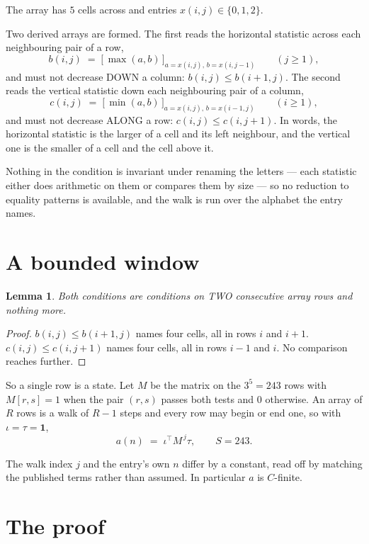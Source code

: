 \documentclass[11pt,a4paper]{article}
\theoremstyle{plain}
\newtheorem{lemma}[theorem]{Lemma}
\theoremstyle{definition}
\begin{document}
The array has $5$ cells across and entries $x(i,j)\in\{0,1,2\}$.

Two derived arrays are formed. The first reads the horizontal statistic across each
neighbouring pair of a row,
\[
b(i,j)\;=\;\bigl[\,\max(a,b)\,\bigr]_{a=x(i,j),\,b=x(i,j-1)}\qquad (j\ge1),
\]
and must not decrease DOWN a column: $b(i,j)\le b(i{+}1,j)$. The second reads the vertical
statistic down each neighbouring pair of a column,
\[
c(i,j)\;=\;\bigl[\,\min(a,b)\,\bigr]_{a=x(i,j),\,b=x(i{-}1,j)}\qquad (i\ge1),
\]
and must not decrease ALONG a row: $c(i,j)\le c(i,j{+}1)$. In words, the horizontal statistic
is the larger of a cell and its left neighbour, and the vertical one is
the smaller of a cell and the cell above it.

Nothing in the condition is invariant under renaming the letters --- each statistic either does
arithmetic on them or compares them by size --- so no reduction to equality patterns is
available, and the walk is run over the alphabet the entry names.

\section{A bounded window}

\begin{lemma}\label{lem:win}
Both conditions are conditions on TWO consecutive array rows and nothing more.
\end{lemma}

\begin{proof}
$b(i,j)\le b(i{+}1,j)$ names four cells, all in rows $i$ and $i+1$. $c(i,j)\le c(i,j{+}1)$
names four cells, all in rows $i-1$ and $i$. No comparison reaches further.
\end{proof}

So a single row is a state. Let $M$ be the matrix on the $3^{5}=243$ rows with
$M[r,s]=1$ when the pair $(r,s)$ passes both tests and $0$ otherwise. An array of $R$ rows is a
walk of $R-1$ steps and every row may begin or end one, so with $\iota=\tau=\mathbf{1}$,
\[
a(n)\;=\;\iota^{\!\top}M^{\,j}\tau ,\qquad S=243.
\]

The walk index $j$ and the entry's own $n$ differ by a constant, read off by matching the
published terms rather than assumed. In particular $a$ is $C$-finite.

\section{The proof}
\end{document}
